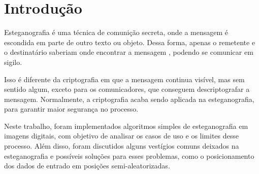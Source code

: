 \section{Introdução} \label{sec:introducao}

Esteganografia é uma técnica de comunição secreta, onde a mensagem é escondida em parte de outro texto ou objeto. Dessa forma, apenas o remetente e o destinatário saberiam onde encontrar a mensagem , podendo se comunicar em sigilo.


Isso é diferente da criptografia em que a mensagem continua visível, mas sem sentido algum, exceto para os comunicadores, que conseguem descriptografar a mensagem. Normalmente, a criptografia acaba sendo aplicada na esteganografia, para garantir maior segurança no processo.

Neste trabalho, foram implementados algoritmos simples de esteganografia em imagens digitais, com objetivo de analisar os casos de uso e os limites desse processo. Além disso, foram discutidos alguns vestígios comuns deixados na esteganografia e possíveis soluções para esses problemas, como o posicionamento dos dados de entrado em posições semi-aleatorizadas.
